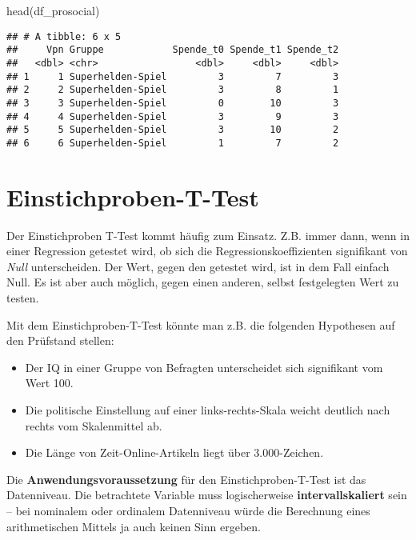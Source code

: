 \documentclass[
]{book}
\newenvironment{Shaded}{\begin{snugshade}}{\end{snugshade}}
\newcommand{\FunctionTok}[1]{\textcolor[rgb]{0.00,0.00,0.00}{#1}}
\newcommand{\NormalTok}[1]{#1}
\begin{document}
\begin{Shaded}
\begin{Highlighting}[]
\FunctionTok{head}\NormalTok{(df\_prosocial)}
\end{Highlighting}
\end{Shaded}

\begin{verbatim}
## # A tibble: 6 x 5
##     Vpn Gruppe            Spende_t0 Spende_t1 Spende_t2
##   <dbl> <chr>                 <dbl>     <dbl>     <dbl>
## 1     1 Superhelden-Spiel         3         7         3
## 2     2 Superhelden-Spiel         3         8         1
## 3     3 Superhelden-Spiel         0        10         3
## 4     4 Superhelden-Spiel         3         9         3
## 5     5 Superhelden-Spiel         3        10         2
## 6     6 Superhelden-Spiel         1         7         2
\end{verbatim}

\hypertarget{einstichproben-t-test}{%
\section{Einstichproben-T-Test}\label{einstichproben-t-test}}

Der Einstichproben T-Test kommt häufig zum Einsatz. Z.B. immer dann, wenn in einer Regression getestet wird, ob sich die Regressionskoeffizienten signifikant von \emph{Null} unterscheiden.
Der Wert, gegen den getestet wird, ist in dem Fall einfach Null.
Es ist aber auch möglich, gegen einen anderen, selbst festgelegten Wert zu testen.

Mit dem Einstichproben-T-Test könnte man z.B. die folgenden Hypothesen auf den Prüfstand stellen:

\begin{itemize}
\item
  Der IQ in einer Gruppe von Befragten unterscheidet sich signifikant vom Wert 100.
\item
  Die politische Einstellung auf einer links-rechts-Skala weicht deutlich nach rechts vom Skalenmittel ab.
\item
  Die Länge von Zeit-Online-Artikeln liegt über 3.000-Zeichen.
\end{itemize}

Die \textbf{Anwendungsvoraussetzung} für den Einstichproben-T-Test ist das Datenniveau. Die betrachtete Variable muss logischerweise \textbf{intervallskaliert} sein -- bei nominalem oder ordinalem Datenniveau würde die Berechnung eines arithmetischen Mittels ja auch keinen Sinn ergeben.
\end{document}
